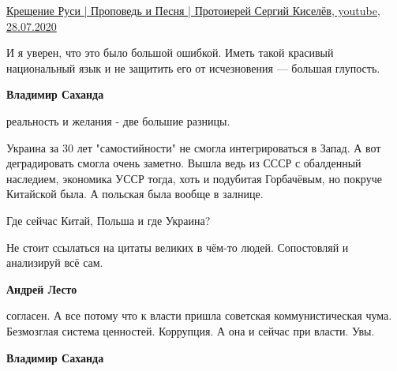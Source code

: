 \begin{itemize}
\href{https://www.youtube.com/watch?v=nJ2hFFjFah0}{%
Крещение Руси | Проповедь и Песня | Протоиерей Сергий Киселёв, youtube, 28.07.2020%
}

 

И я уверен, что это было большой ошибкой. Иметь такой красивый национальный
язык и не защитить его от исчезновения — большая глупость.

\begin{itemize}
 
\textbf{Владимир Саханда} 

реальность и желания - две большие разницы.

Украина за 30 лет "самостийности" не смогла интегрироваться в Запад. А вот
деградировать смогла очень заметно. Вышла ведь из СССР с обалденный наследием,
экономика УССР тогда, хоть и подубитая Горбачёвым, но покруче Китайской была. А
польская была вообще в залнице.

Где сейчас Китай, Польша и где Украина?

Не стоит ссылаться на цитаты великих в чём-то людей. Сопостовляй и анализируй
всё сам.

 
\textbf{Андрей Лесто} 

согласен. А все потому что к власти пришла советская коммунистическая чума.
Безмозглая система ценностей. Коррупция. А она и сейчас при власти. Увы.


 
\textbf{Владимир Саханда} 


\end{itemize}
\end{itemize}
